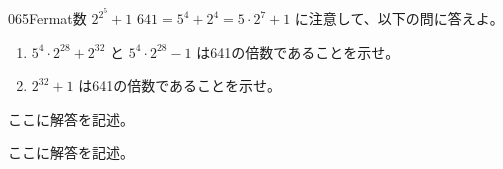 \begin{thm}{065}{}{Fermat数 $2^{2^5}+1$}
 $641=5^4+2^4=5\cdot 2^7 +1$ に注意して、以下の問に答えよ。
 \begin{enumerate}
  \item $5^4\cdot 2^{28}+2^{32}$ と $5^4\cdot 2^{28} -1$ は641の倍数であることを示せ。
  \item $2^{32}+1$ は641の倍数であることを示せ。
 \end{enumerate}
\end{thm}

ここに解答を記述。

ここに解答を記述。